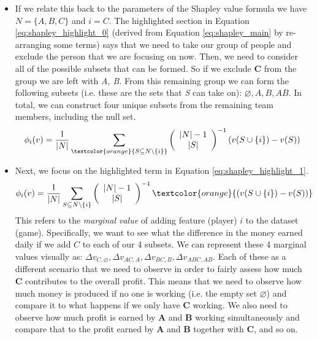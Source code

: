 \begin{itemize}
    \item If we relate this back to the parameters of the Shapley value formula we have $N = \{A, B, C\}$ and $i = C$. The highlighted section in Equation \ref{eq:shapley_highlight_0} (derived from Equation \ref{eq:shapley_main} by re-arranging some terms) says that we need to take our group of people and exclude the person that we are focusing on now. Then, we need to consider all of the possible subsets that can be formed. So if we exclude \textbf{C} from the group we are left with \emph{{A, B}}. From this remaining group we can form the following subsets (i.e. these are the sets that \emph{S} can take on): $\varnothing, A, B, AB$. In total, we can construct four unique subsets from the remaining team members, including the null set.
    \begin{align}\label{eq:shapley_highlight_0}
    \phi_{i}(v)=\frac{1}{|N|} \sum_{\textcolor{orange}{S \subseteq N \backslash\{i\}}}\left(\begin{array}{c}
    |N|-1 \\
    |S|
    \end{array}\right)^{-1}(v(S \cup\{i\})-v(S))
    \end{align}
    \item Next, we focus on the highlighted term  in Equation \ref{eq:shapley_highlight_1}.
    \begin{align}\label{eq:shapley_highlight_1}
    \phi_{i}(v)=\frac{1}{|N|} \sum_{S \subseteq N \backslash\{i\}}\left(\begin{array}{c}
    |N|-1 \\
    |S|
    \end{array}\right)^{-1}\textcolor{orange}{(v(S \cup\{i\})-v(S))}
    \end{align}
    This refers to the \emph{marginal value} of adding feature (player) $i$ to the dataset (game). Specifically, we want to see what the difference in the money earned daily if we add $C$ to each of our 4 subsets. We can represent these 4 marginal values visually as: $\Delta v_{C, \varnothing}, \Delta v_{AC, A}, \Delta v_{BC, B}, \Delta v_{A B C, A B}$. Each of these as a different scenario that we need to observe in order to fairly assess how much \textbf{C} contributes to the overall profit. This means that we need to observe how much money is produced if no one is working (i.e. the empty set $\varnothing$) and compare it to what happens if we only have \textbf{C} working. We also need to observe how much profit is earned by \textbf{A} and \textbf{B} working simultaneously and compare that to the profit earned by \textbf{A} and \textbf{B} together with \textbf{C}, and so on.

\end{itemize}
